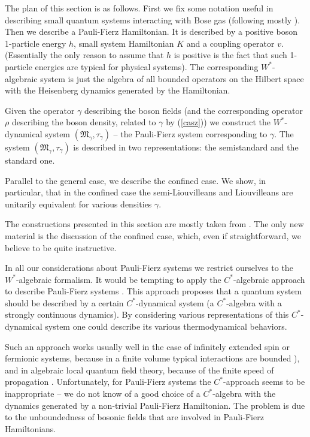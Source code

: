 \documentclass{svmult}
\def\PF{{}}
\def\fM{{\mathfrak M}}
\begin{document}
The plan of this section is as follows. First we fix some notation useful in
 describing small quantum systems interacting with Bose gas (following mostly
 \cite{DJ2}). 
Then
 we describe  a Pauli-Fierz Hamiltonian. It is described by a positive 
boson 1-particle energy $h$,
small system Hamiltonian $K$ and a coupling operator $v$. (Essentially the
 only reason to assume that $h$ is positive is the fact that such 1-particle
 energies are typical for physical systems).
The corresponding
$W^*$-algebraic system is just the
 algebra of all bounded operators on  the Hilbert space with the Heisenberg
dynamics generated by the Hamiltonian.


Given the operator $\gamma$ describing the boson
fields (and the corresponding operator $\rho$ 
describing the boson density, related to $\gamma$ by (\ref{casz}))
  we construct the
$W^*$-dynamical system $(\fM_\gamma^\PF,\tau_\gamma)$
 -- the Pauli-Fierz system corresponding to $\gamma$.
The  system $(\fM_\gamma^\PF,\tau_\gamma)$
is described in two representations: the semistandard
and the standard one. 

Parallel to the general case, we  describe the confined case. 
We show, in particular,
that  in the confined case the semi-Liouvilleans and Liouvilleans are
 unitarily equivalent for various densities $\gamma$. 

The constructions presented in this
 section are mostly taken from \cite{DJ2}. The only new  material is the
 discussion of the confined case, which, even if  straightforward, we
 believe to be  quite instructive.

\begin{remark}
In all our considerations about Pauli-Fierz systems
we restrict ourselves to the $W^*$-algebraic
formalism. 
It would be tempting to apply the  $C^*$-algebraic approach
 to describe
Pauli-Fierz systems \cite{BR2}. 
This approach proposes that a quantum system should
be described by a certain  $C^*$-dynamical system (a $C^*$-algebra with a
strongly continuous dynamics). By
considering various representations
of this $C^*$-dynamical system one could
 describe its various thermodynamical behaviors.



Such an approach works usually well in the case of infinitely extended spin or
fermionic systems, because in a finite volume
   typical interactions are bounded \cite{BR2}),
  and in algebraic local quantum field theory, because of the finite speed of
  propagation \cite{Haa}.
  Unfortunately, for Pauli-Fierz systems the $C^*$-approach
  seems to be inappropriate -- we do not know
of a  good choice of a
  $C^*$-algebra with the dynamics generated by a non-trivial Pauli-Fierz
  Hamiltonian. The problem is due to the unboundedness of  bosonic
fields that are involved in  
 Pauli-Fierz Hamiltonians. 
\end{remark}
\end{document}
